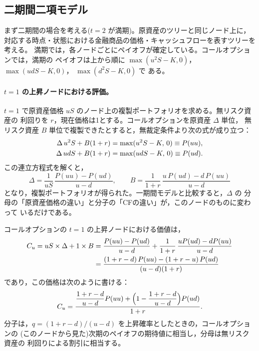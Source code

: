 \subsection{二期間二項モデル}

まず二期間の場合を考える($t=2$ が満期)。原資産のツリーと同じノード上に，
対応する時点・状態における金融商品の価格・キャッシュフローを表すツリーを考える。
満期では，各ノードごとにペイオフが確定している。コールオプションでは，満期の
ペイオフは上から順に $\max(u^2S-K,0)$， $\max(udS-K,0)$， $\max(d^2S-K,0)$ で
ある。

\paragraph{$t=1$ の上昇ノードにおける評価。}
$t=1$ で原資産価格 $uS$ のノード上の複製ポートフォリオを求める。無リスク資産の
利回りを $r$，現在価格は1とする。コールオプションを原資産 $\Delta$ 単位，
無リスク資産 $B$ 単位で複製できたとすると，無裁定条件より次の式が成り立つ：
\begin{align}
\Delta\,u^2S + B(1+r) &= \max(u^2S-K,\,0) \equiv P(uu),\notag\\
\Delta\,udS + B(1+r) &= \max(udS-K,\,0) \equiv P(ud).
\end{align}
この連立方程式を解くと，
\begin{equation}
\Delta = \frac{1}{uS}\,\frac{P(uu)-P(ud)}{u-d},\qquad
B = \frac{1}{1+r}\,\frac{u\,P(ud) - d\,P(uu)}{u-d}
\end{equation}
となり，複製ポートフォリオが得られた。一期間モデルと比較すると，$\Delta$ の
分母の「原資産価格の違い」と分子の「CFの違い」が，このノードのものに変わって
いるだけである。

コールオプションの $t=1$ の上昇ノードにおける価値は，
\begin{align}
C_u = uS\times\Delta + 1\times B
&= \frac{P(uu)-P(ud)}{u-d} + \frac{1}{1+r}\,\frac{uP(ud)-dP(uu)}{u-d}\notag\\
&= \frac{(1+r-d)\,P(uu) - (1+r-u)\,P(ud)}{(u-d)(1+r)}
\end{align}
であり，この価格は次のように書ける：
\begin{equation}
C_u = \frac{\dfrac{1+r-d}{u-d}P(uu)
+ \Bigl(1 - \dfrac{1+r-d}{u-d}\Bigr)P(ud)}{1+r}.
\end{equation}
分子は，$q = (1+r-d)/(u-d)$ を上昇確率としたときの，コールオプションの
(このノードから見た)次期のペイオフの期待値に相当し，分母は無リスク資産の
利回りによる割引に相当する。

